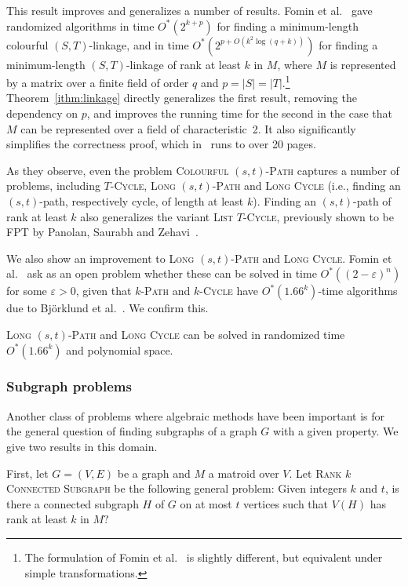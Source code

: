 \documentclass{theoretics}
\begin{document}
This result improves and generalizes a number of results.
Fomin et al.~\cite{FominGKSS24} gave randomized algorithms in time $O^*(2^{k+p})$
for finding a minimum-length colourful $(S,T)$-linkage,
and in time $O^*(2^{p+O(k^2 \log (q+k))})$
for finding a minimum-length $(S,T)$-linkage of rank at least $k$ in $M$,
where $M$ is represented by a matrix over a finite field of order $q$
and $p=|S|=|T|$.\footnote{The formulation of Fomin et al.~\cite{FominGKSS24}
  is slightly different, but equivalent under simple transformations.}
Theorem~\ref{ithm:linkage} directly generalizes the first result,
removing the dependency on $p$, and improves the running time for the second in the case
that $M$ can be represented over a field of characteristic~2.
It also significantly simplifies the correctness proof, which in~\cite{FominGKSS24}
runs to over 20 pages.

As they observe, even the problem \textsc{Colourful $(s,t)$-Path}
captures a number of problems, including \textsc{$T$-Cycle},
\textsc{Long $(s,t)$-Path} and \textsc{Long Cycle} (i.e.,
finding an $(s,t)$-path, respectively cycle, of length at least $k$).
Finding an $(s,t)$-path of rank at least $k$ also generalizes the
variant \textsc{List $T$-Cycle}, previously shown to be FPT by
Panolan, Saurabh and Zehavi~\cite{DBLP:journals/algorithmica/PanolanSZ19}.

We also show an improvement to \textsc{Long $(s,t)$-Path} and
\textsc{Long Cycle}. Fomin et al.~\cite{FominGKSS24} ask as an
open problem whether these can be solved in time $O^*((2-\varepsilon)^n)$
for some $\varepsilon > 0$, given that \textsc{$k$-Path} and \textsc{$k$-Cycle} 
have $O^*(1.66^k)$-time algorithms due to Björklund et al.~\cite{BjorklundHKK17narrow}. 
We confirm this.

\begin{theorem} \label{ithm:longpath}
  \textsc{Long $(s,t)$-Path} and \textsc{Long Cycle} can be solved in
  randomized time $O^*(1.66^k)$ and polynomial space. 
\end{theorem}

\subsubsection{Subgraph problems}
\label{ssec:subgraph}
Another class of problems where algebraic methods have been important
is for the general question of finding subgraphs of a graph $G$ with a given property. 
We give two results in this domain.

First, let $G=(V,E)$ be a graph and $M$ a matroid over $V$.
Let \textsc{Rank $k$ Connected Subgraph} be the following general problem:
Given integers $k$ and $t$, is there a connected subgraph $H$ of $G$
on at most $t$ vertices such that $V(H)$ has rank at least $k$ in $M?$
\end{document}
